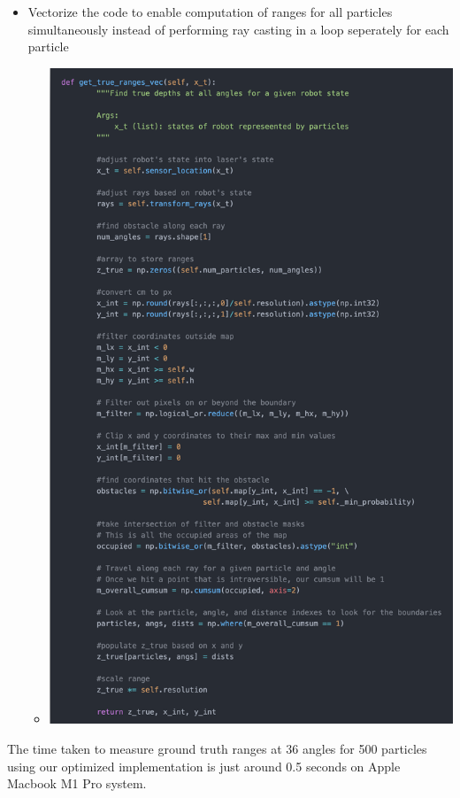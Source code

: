\documentclass[12pt, a4paper]{article}
\begin{document}
\begin{itemize}
  \item Vectorize the code to enable computation of ranges for all particles simultaneously instead of performing ray casting in a loop seperately for each particle
  \begin{itemize}
    \item 
    \begin{minipage}[t]{\linewidth}
      \vspace{0pt}
      \begin{center}
        \includegraphics[scale=0.25]{./results/ray_casting_opt_2.png}
        \label{fig:sm_1}
      \end{center}
    \end{minipage}
  \end{itemize}
\end{itemize}
The time taken to measure ground truth ranges at 36 angles for 500 particles using our optimized implementation is just around 0.5 seconds on Apple Macbook M1 Pro system.
\end{document}
